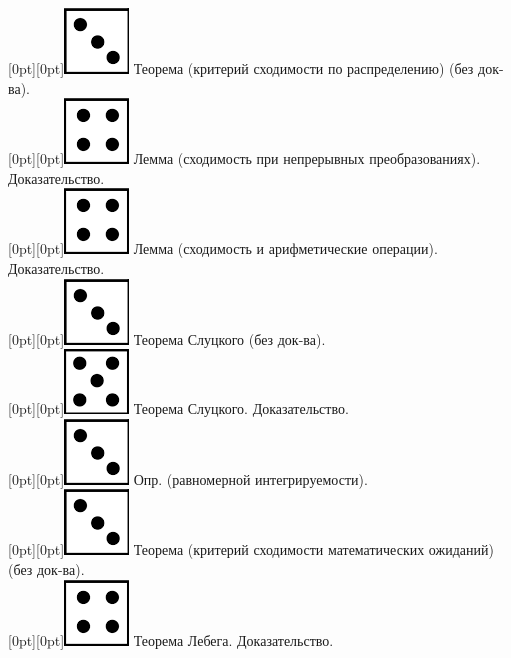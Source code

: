 \documentclass[10pt]{amsart}
\begin{document}
\begin{enumerate}
\begin{enumerate}
 \raisebox{-1pt}[0pt][0pt]{\includegraphics[width=0.02\linewidth]{3.png}} Теорема (критерий сходимости по распределению) (без док-ва). \\
 \raisebox{-1pt}[0pt][0pt]{\includegraphics[width=0.02\linewidth]{4.png}} Лемма  (сходимость при непрерывных преобразованиях). Доказательство. \\
 \raisebox{-1pt}[0pt][0pt]{\includegraphics[width=0.02\linewidth]{4.png}} Лемма (сходимость и арифметические операции). Доказательство. \\
 \raisebox{-1pt}[0pt][0pt]{\includegraphics[width=0.02\linewidth]{3.png}} Теорема Слуцкого (без док-ва). \\
 \raisebox{-1pt}[0pt][0pt]{\includegraphics[width=0.02\linewidth]{5.png}} Теорема Слуцкого. Доказательство. \\
 \raisebox{-1pt}[0pt][0pt]{\includegraphics[width=0.02\linewidth]{3.png}} Опр. (равномерной интегрируемости). \\
 \raisebox{-1pt}[0pt][0pt]{\includegraphics[width=0.02\linewidth]{3.png}} Теорема (критерий сходимости математических ожиданий) (без док-ва). \\
 \raisebox{-1pt}[0pt][0pt]{\includegraphics[width=0.02\linewidth]{4.png}} Теорема Лебега. Доказательство. \\

         
    

\end{enumerate}
\end{enumerate}
\end{document}
